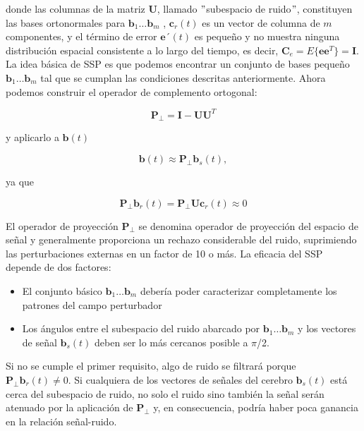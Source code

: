 \documentclass[11pt,letterpaper]{article}
\numberwithin{equation}{subsection}
\numberwithin{table}{subsection}
\begin{document}
\noindent donde las columnas de la matriz $\textbf{U}$, llamado $"$subespacio de ruido$"$, constituyen las bases ortonormales para $\textbf{b}_1 \ldots \textbf{b}_m$ , $\textbf{c}_r(t)$ es un vector de columna de $m$ componentes, y el término de error $\textbf{e}´(t)$ es pequeño y no muestra ninguna distribución espacial consistente a lo largo del tiempo, es decir, $\textbf{C}_e= E\{\textbf{e}\textbf{e}^T\} = \textbf{I}$. La idea básica de SSP es que podemos encontrar un conjunto de bases pequeño $\textbf{b}_1 \ldots \textbf{b}_m$ tal que se cumplan las condiciones descritas anteriormente. Ahora podemos construir el operador de complemento ortogonal:

\begin{equation}
\textbf{P}_\perp = \textbf{I} - \textbf{UU}^T
\end{equation}

\noindent y aplicarlo a $\textbf{b}(t)$

\begin{equation}
\textbf{b}(t) \approx \textbf{P}_\perp\textbf{b}_s(t),
\end{equation}

\noindent ya que

\begin{equation}
\textbf{P}_\perp\textbf{b}_r(t) = \textbf{P}_\perp \textbf{Uc}_r(t) \approx 0
\end{equation}

\noindent El operador de proyección $\textbf{P}_\perp$ se denomina operador de proyección del espacio de señal y generalmente proporciona un rechazo considerable del ruido, suprimiendo las perturbaciones externas en un factor de 10 o más. La eficacia del SSP depende de dos factores:

\begin{itemize}
\item El conjunto básico $\textbf{b}_1 \ldots \textbf{b}_m$ debería poder caracterizar completamente los patrones del campo perturbador 
\item Los ángulos entre el subespacio del ruido abarcado por $\textbf{b}_1 \ldots \textbf{b}_m$ y los vectores de señal $\textbf{b}_s(t)$ deben ser lo más cercanos posible a $\pi$/2.


\end{itemize}

\bigskip
\noindent Si no se cumple el primer requisito, algo de ruido se filtrará porque $\textbf{P}_\perp\textbf{b}_r(t) \neq 0$. Si cualquiera de los vectores de señales del cerebro $\textbf{b}_s(t)$ está cerca del subespacio de ruido, no solo el ruido sino también la señal serán atenuado por la aplicación de $\textbf{P}_\perp$ y, en consecuencia, podría haber poca ganancia en la relación señal-ruido.
\end{document}
